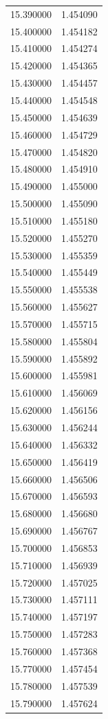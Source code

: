 \begin{tabular}{rr}
15.390000 & 1.454090 \\
15.400000 & 1.454182 \\
15.410000 & 1.454274 \\
15.420000 & 1.454365 \\
15.430000 & 1.454457 \\
15.440000 & 1.454548 \\
15.450000 & 1.454639 \\
15.460000 & 1.454729 \\
15.470000 & 1.454820 \\
15.480000 & 1.454910 \\
15.490000 & 1.455000 \\
15.500000 & 1.455090 \\
15.510000 & 1.455180 \\
15.520000 & 1.455270 \\
15.530000 & 1.455359 \\
15.540000 & 1.455449 \\
15.550000 & 1.455538 \\
15.560000 & 1.455627 \\
15.570000 & 1.455715 \\
15.580000 & 1.455804 \\
15.590000 & 1.455892 \\
15.600000 & 1.455981 \\
15.610000 & 1.456069 \\
15.620000 & 1.456156 \\
15.630000 & 1.456244 \\
15.640000 & 1.456332 \\
15.650000 & 1.456419 \\
15.660000 & 1.456506 \\
15.670000 & 1.456593 \\
15.680000 & 1.456680 \\
15.690000 & 1.456767 \\
15.700000 & 1.456853 \\
15.710000 & 1.456939 \\
15.720000 & 1.457025 \\
15.730000 & 1.457111 \\
15.740000 & 1.457197 \\
15.750000 & 1.457283 \\
15.760000 & 1.457368 \\
15.770000 & 1.457454 \\
15.780000 & 1.457539 \\
15.790000 & 1.457624 \\

\end{tabular}

